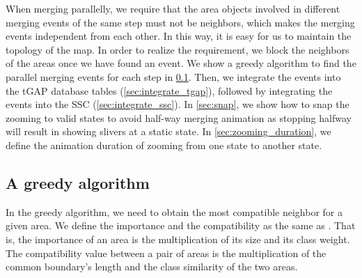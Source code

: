 \documentclass{ica}
\begin{document}
When merging parallelly,
we require that 
the area objects involved in different merging events of the same step 
must not be neighbors, 
which makes the merging events independent from each other.
In this way, it is easy for us to maintain the topology of the map.
In order to realize the requirement,
we block the neighbors of the areas once we have found an event.
We show a greedy algorithm to find the parallel merging events for each step
in \sect\ref{sec:greedy_algo}.
Then, we integrate the events into the tGAP database tables
(\sect\ref{sec:integrate_tgap}),
followed by integrating the events into the SSC 
(\sect\ref{sec:integrate_ssc}).
In \sect\ref{sec:snap}, we show how to snap the zooming to valid states
to avoid half-way merging animation 
as stopping halfway will result in showing slivers at a static state.
In \sect\ref{sec:zooming_duration}, we define 
the animation duration of zooming from one state to another state.


\subsection{A greedy algorithm}
\label{sec:greedy_algo}

In the greedy algorithm, 
we need to obtain the most compatible neighbor for a given area.
We define the importance and the compatibility as
the same as %
\citet{vanPutten1998NewGAP}.
That is, the importance of an area is the multiplication 
of its size and its class weight.
The compatibility value between a pair of areas is 
the multiplication of the common boundary's length and 
the class similarity of the two areas.
\end{document}

